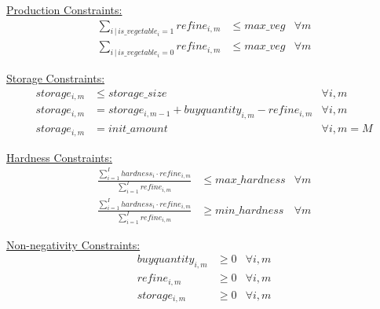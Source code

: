 \documentclass{article}
\begin{document}
\underline{Production Constraints:}
\begin{align*}
\sum_{i \,|\, is\_vegetable_i = 1} refine_{i,m} & \leq max\_veg & \forall m \\
\sum_{i \,|\, is\_vegetable_i = 0} refine_{i,m} & \leq max\_veg & \forall m 
\end{align*}

\underline{Storage Constraints:}
\begin{align*}
storage_{i,m} & \leq storage\_size & \forall i, m \\
storage_{i,m} & = storage_{i,m-1} + buyquantity_{i,m} - refine_{i,m} & \forall i, m \\
storage_{i,m} & = init\_amount & \forall i, m = M
\end{align*}

\underline{Hardness Constraints:}
\begin{align*}
\frac{\sum_{i=1}^{I} hardness_{i} \cdot refine_{i,m}}{\sum_{i=1}^{I} refine_{i,m}} & \leq max\_hardness & \forall m \\
\frac{\sum_{i=1}^{I} hardness_{i} \cdot refine_{i,m}}{\sum_{i=1}^{I} refine_{i,m}} & \geq min\_hardness & \forall m
\end{align*}

\underline{Non-negativity Constraints:}
\begin{align*}
buyquantity_{i,m} & \geq 0 & \forall i, m \\
refine_{i,m} & \geq 0 & \forall i, m \\
storage_{i,m} & \geq 0 & \forall i, m
\end{align*}
\end{document}
